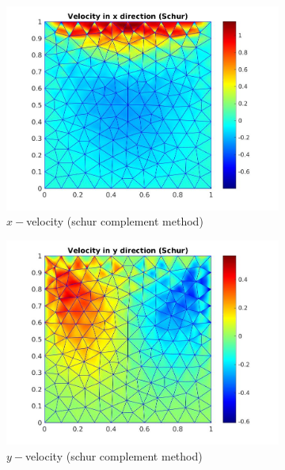 \documentclass[a4paper]{book}
\begin{document}
\begin{figure}[H]
\begin{subfigure}{0.5\textwidth}	
  \includegraphics[width=\linewidth]{lid_schur_vx.jpg}
  \caption{$x-$velocity (schur complement method)}
  \label{x_vel_stoke_schur_lid}
\end{subfigure}
\begin{subfigure}{0.5\textwidth}	
  \includegraphics[width=\linewidth]{lid_schur_vy.jpg}
  \caption{$y-$velocity (schur complement method)}
  \label{y_vel_stoke_schur_lid}
\end{subfigure}
\begin{subfigure}{\textwidth}	

\end{subfigure}
\end{figure}
\end{document}
